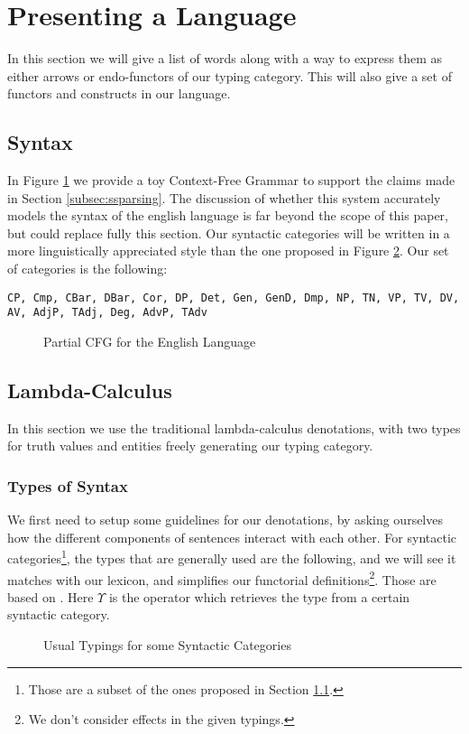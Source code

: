 \section{Presenting a Language}
\label{sec:language}
In this section we will give a list of words along with a way to express them as either arrows or endo-functors of our typing category.
This will also give a set of functors and constructs in our language.

\subsection{Syntax}
\label{subsec:syntax}
In Figure \ref{fig:english-cfg} we provide a toy Context-Free Grammar to
support the claims made in Section \ref{subsec:ssparsing}.
The discussion of whether this system accurately models the syntax of the
english language is far beyond the scope of this paper, but could replace
fully this section.
Our syntactic categories will be written in a more linguistically
appreciated style than the one proposed in Figure \ref{fig:sctypes}.
Our set of categories is the following:
\begin{center}
	\tt CP, Cmp, CBar, DBar, Cor, DP, Det, Gen, GenD, Dmp, NP, TN, VP, TV, DV, AV, AdjP, TAdj, Deg, AdvP, TAdv
\end{center}

\begin{figure}
	\centering
	
	\caption{Partial CFG for the English Language}\label{fig:english-cfg}
\end{figure}

\subsection{Lambda-Calculus}\label{subsec:lambdacalc}
In this section we use the traditional lambda-calculus denotations, with
two types for truth values and entities freely generating our typing category.

\subsubsection{Types of Syntax}\label{subsec:typingsyntax}
We first need to setup some guidelines for our denotations, by asking ourselves
how the different components of sentences interact with each other.
For syntactic categories\footnote{Those are a subset of the ones proposed
	in Section \ref{subsec:syntax}.}, the types that are generally used are the
following, and we will see it matches with our lexicon, and simplifies our
functorial definitions\footnote{We don't consider effects in the given typings.}.
Those are based on \cite{parteeLecture2Lambda}. Here $\Upsilon$ is the
operator which retrieves the type from a certain syntactic category.
\begin{figure}
	\centering
	
	\caption{Usual Typings for some Syntactic Categories}
	\label{fig:sctypes}
\end{figure}

